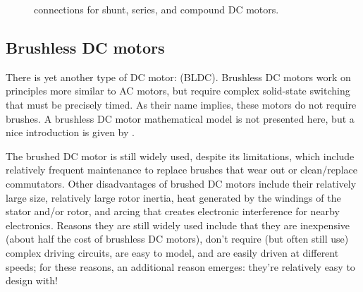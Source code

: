 \documentclass[dynamic_systems.tex]{subfiles}
\begin{document}
\begin{figure}
\centering
{}
\hfill
{}
\hfill
{}
\caption{connections for shunt, series, and compound DC motors.}
\label{fig:dc_motor_03}
\end{figure}

\subsection{Brushless DC motors}
\tags{}

There is yet another type of DC motor:  (BLDC).
Brushless DC motors work on principles more similar to AC motors, but require complex solid-state switching that must be precisely timed.
As their name implies, these motors do not require brushes.
A brushless DC motor mathematical model is not presented here, but a nice introduction is given by \citet{Baldursson2005}. 
\tags{}

The brushed DC motor is still widely used, despite its limitations, which include relatively frequent maintenance to replace brushes that wear out or clean/replace commutators. 
Other disadvantages of brushed DC motors include their relatively large size, relatively large rotor inertia, heat generated by the windings of the stator and/or rotor, and arcing that creates electronic interference for nearby electronics. 
Reasons they are still widely used include that they are inexpensive (about half the cost of brushless DC motors), don't require (but often still use) complex driving circuits, are easy to model, and are easily driven at different speeds; for these reasons, an additional reason emerges: they're relatively easy to design with!
\tags{}
\end{document}

